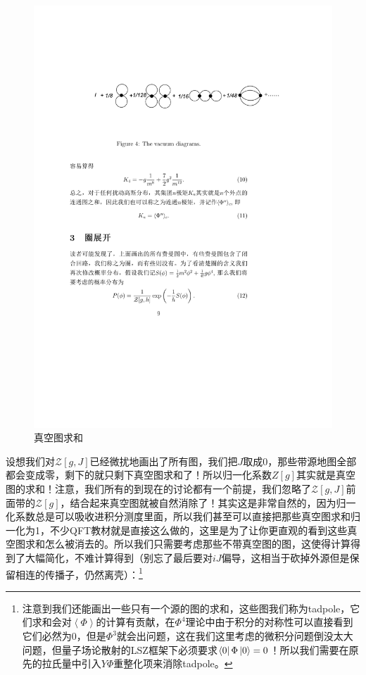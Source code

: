 \begin{figure}[H]
	\centering
	\includegraphics{figs/fig5.pdf}
	\caption{真空图求和}
\end{figure}
设想我们对$\mathcal{Z}[g,J]$已经微扰地画出了所有图，我们把$J$取成0，那些带源地图全部都会变成零，剩下的就只剩下真空图求和了！所以归一化系数$Z[g]$其实就是真空图的求和！注意，我们所有的到现在的讨论都有一个前提，我们忽略了$\mathcal{Z}[g,J]$前面带的$\mathcal{Z}[g]$，结合起来真空图就被自然消除了！其实这是非常自然的，因为归一化系数总是可以吸收进积分测度里面，所以我们甚至可以直接把那些真空图求和归一化为1，不少QFT教材就是直接这么做的，这里是为了让你更直观的看到这些真空图求和怎么被消去的。所以我们只需要考虑那些不带真空图的图，这使得计算得到了大幅简化，不难计算得到（别忘了最后要对$iJ$偏导，这相当于砍掉外源但是保留相连的传播子，仍然离壳）：\footnote{注意到我们还能画出一些只有一个源的图的求和，这些图我们称为tadpole，它们求和会对$\left<\Phi\right>$的计算有贡献，在$\Phi^4$理论中由于积分的对称性可以直接看到它们必然为0，但是$\Phi^3$就会出问题，这在我们这里考虑的微积分问题倒没太大问题，但量子场论散射的LSZ框架下必须要求$\bra{0}\Phi\ket{0}=0$！所以我们需要在原先的拉氏量中引入$Y\Phi$重整化项来消除tadpole。}
